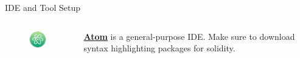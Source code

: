 \documentclass[]{beamer}
\begin{document}
\begin{frame}{IDE and Tool Setup}
	\begin{columns}
	\begin{column}{0.1\textwidth}
			\begin{figure}
				\includegraphics[width = \textwidth]{../assets/images/logo_atom.png}
			\end{figure}
		\end{column}
		\begin{column}{0.85\textwidth}
			\textbf{\href{https://atom.io/}{\link Atom}} is a general-purpose IDE. Make sure to download syntax highlighting packages for solidity.
		\end{column}
	\end{columns}
	
	\vspace{1em}
	
\end{frame}
\end{document}
